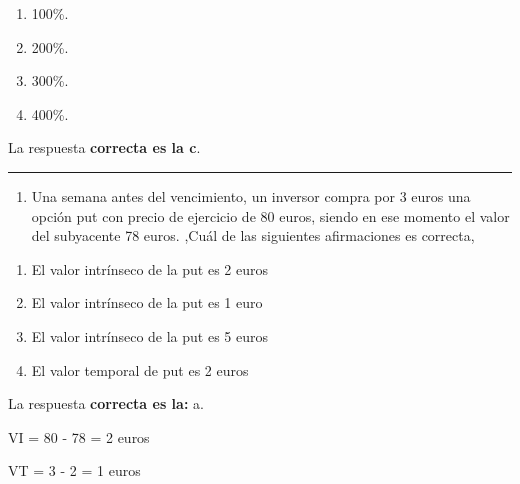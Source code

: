 \documentclass[
  letterpaper,
  DIV=11,
  numbers=noendperiod]{scrreprt}
\providecommand{\tightlist}{%
  \setlength{\itemsep}{0pt}\setlength{\parskip}{0pt}}\usepackage{longtable,booktabs,array}
\begin{document}
\begin{enumerate}
\def\labelenumi{\alph{enumi}.}
\item
  100\%.
\item
  200\%.
\item
  300\%.
\item
  400\%.
\end{enumerate}

\begin{tcolorbox}[enhanced jigsaw, left=2mm, opacityback=0, colback=white, breakable, arc=.35mm, bottomrule=.15mm, rightrule=.15mm, toprule=.15mm, leftrule=.75mm, colframe=quarto-callout-tip-color-frame]
\begin{minipage}[t]{5.5mm}
\textcolor{quarto-callout-tip-color}{\faLightbulb}
\end{minipage}%
\begin{minipage}[t]{\textwidth - 5.5mm}

La respuesta \textbf{correcta es la c}.

\end{minipage}%
\end{tcolorbox}

\begin{center}\rule{0.5\linewidth}{0.5pt}\end{center}

\begin{enumerate}
\def\labelenumi{\arabic{enumi}.}
\setcounter{enumi}{73}
\tightlist
\item
  Una semana antes del vencimiento, un inversor compra por 3 euros una
  opción put con precio de ejercicio de 80 euros, siendo en ese momento
  el valor del subyacente 78 euros. ,Cuál de las siguientes afirmaciones
  es correcta,
\end{enumerate}

\begin{enumerate}
\def\labelenumi{\alph{enumi}.}
\item
  El valor intrínseco de la put es 2 euros
\item
  El valor intrínseco de la put es 1 euro
\item
  El valor intrínseco de la put es 5 euros
\item
  El valor temporal de put es 2 euros
\end{enumerate}

\begin{tcolorbox}[enhanced jigsaw, left=2mm, opacityback=0, colback=white, breakable, arc=.35mm, bottomrule=.15mm, rightrule=.15mm, toprule=.15mm, leftrule=.75mm, colframe=quarto-callout-tip-color-frame]
\begin{minipage}[t]{5.5mm}
\textcolor{quarto-callout-tip-color}{\faLightbulb}
\end{minipage}%
\begin{minipage}[t]{\textwidth - 5.5mm}

La respuesta \textbf{correcta es la:} a.

VI = 80 - 78 = 2 euros

VT = 3 - 2 = 1 euros

\end{minipage}%
\end{tcolorbox}
\end{document}
